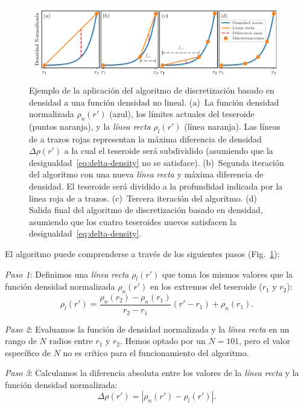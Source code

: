 \begin{figure}
\centering
\includegraphics[width=\linewidth]{figs/tesseroids-variable-density/density-based-discretization-algorithm.pdf}
\caption{
    Ejemplo de la aplicación del algoritmo de discretización basado en densidad
    a una función densidad no lineal.
    (a)~La función densidad normalizada $\rho_n(r')$ (azul), los límites
    actuales del teseroide (puntos naranja), y la \emph{línea recta}
    $\rho_l(r')$ (línea naranja).
    Las líneas de a trazos rojas representan la máxima diferencia de densidad
    $\Delta \rho (r')$ a la cual el teseroide será subdividido (asumiendo que
    la desigualdad~\ref{eq:delta-density} no se satisface).
    (b)~Segunda iteración del algoritmo con una nueva \emph{línea recta}
    y máxima diferencia de densidad. El teseroide será dividido a la
    profundidad indicada por la linea roja de a trazos.
    (c)~Tercera iteración del algoritmo.
    (d)~ Salida final del algoritmo de discretización basado en densidad,
    asumiendo que los cuatro teseroides nuevos satisfacen la
    desigualdad~\ref{eq:delta-density}.
}
\label{fig:density-discretization-algorithm}
\end{figure}


El algoritmo puede comprenderse a través de los siguientes pasos
(Fig.~\ref{fig:density-discretization-algorithm}):

\textit{Paso 1}:
Definimos una \emph{línea recta} $\rho_l(r')$ que toma los mismos valores que
la función densidad normalizada $\rho_n(r')$ en los extremos del teseroide
($r_1$ y $r_2$):
%
\begin{equation}
    \rho_l(r') =
    \frac{ \rho_n(r_2) - \rho_n(r_1) }{ r_2 - r_1 } (r' - r_1) + \rho_n(r_1).
    \label{eq:density-reference-line}
\end{equation}

\textit{Paso 2}:
Evaluamos la función de densidad normalizada y la \emph{línea recta} en un
rango de $N$ radios entre $r_1$ y $r_2$. Hemos optado por un $N = 101$, pero el
valor específico de $N$ no es crítico para el funcionamiento del algoritmo.

\textit{Paso 3}:
Calculamos la diferencia absoluta entre los valores de la \emph{línea recta}
y la función densidad normalizada:
%
\begin{equation}
    \Delta \rho (r') = | \rho_n(r') - \rho_l(r') |.
    \label{eq:density-abs-diff}
\end{equation}

